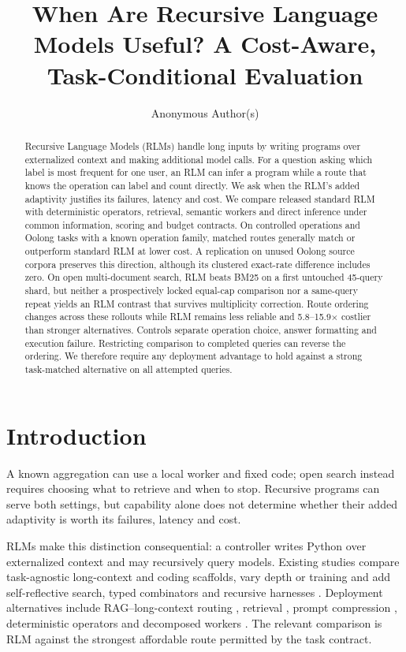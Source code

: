 \documentclass{article}
\title{When Are Recursive Language Models Useful?
A Cost-Aware, Task-Conditional Evaluation}
\author{Anonymous Author(s)}
\begin{document}
\maketitle

\begin{abstract}
		Recursive Language Models (RLMs) handle long inputs by writing programs over externalized context and making additional model calls. For a question asking which label is most frequent for one user, an RLM can infer a program while a route that knows the operation can label and count directly. We ask when the RLM's added adaptivity justifies its failures, latency and cost. We compare released standard RLM with deterministic operators, retrieval, semantic workers and direct inference under common information, scoring and budget contracts. On controlled operations and Oolong tasks with a known operation family, matched routes generally match or outperform standard RLM at lower cost. A replication on unused Oolong source corpora preserves this direction, although its clustered exact-rate difference includes zero. On open multi-document search, RLM beats BM25 on a first untouched 45-query shard, but neither a prospectively locked equal-cap comparison nor a same-query repeat yields an RLM contrast that survives multiplicity correction. Route ordering changes across these rollouts while RLM remains less reliable and 5.8--15.9$\times$ costlier than stronger alternatives. Controls separate operation choice, answer formatting and execution failure. Restricting comparison to completed queries can reverse the ordering. We therefore require any deployment advantage to hold against a strong task-matched alternative on all attempted queries.
\end{abstract}

\section{Introduction}

A known aggregation can use a local worker and fixed code; open search instead requires choosing what to retrieve and when to stop. Recursive programs can serve both settings, but capability alone does not determine whether their added adaptivity is worth its failures, latency and cost.

RLMs \citep{zhang2025rlm} make this distinction consequential: a controller writes Python over externalized context and may recursively query models. Existing studies compare task-agnostic long-context and coding scaffolds, vary depth or training and add self-reflective search, typed combinators and recursive harnesses \citep{zhang2025rlm,bertsch2025oolong,srlm2026,lambdarlm2026,lumer2026rah}. Deployment alternatives include RAG--long-context routing \citep{li2024selfroute,chen2026preroute}, retrieval \citep{lewis2020rag}, prompt compression \citep{jiang2023llmlingua}, deterministic operators and decomposed workers \citep{khot2023decomposed}. The relevant comparison is RLM against the strongest affordable route permitted by the task contract.
\end{document}
